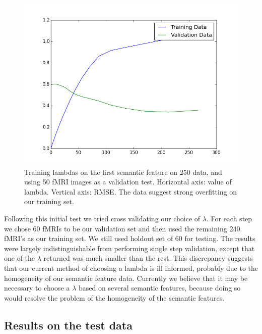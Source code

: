 \documentclass{article} %
\begin{document}
\begin{figure}[h]
\begin{center}
\includegraphics[scale=0.5]{trainvalidlambda}
\end{center}
\caption{Training lambdas on the first semantic feature on 250 data, and using 50 fMRI
images as a validation test. Horizontal axis: value of lambda. Vertical axis: RMSE. The data suggest strong overfitting on our training set.}
\end{figure}

Following this initial test we tried cross validating our choice of $\lambda$. For each step we chose 60 fMRIs to be our validation set and then used the remaining 240 fMRI's as our training set. We still used holdout set of 60 for testing. The results were largely indistinguishable from performing single step validation, except that one of the $\lambda$ returned was much smaller than the rest. This discrepancy suggests that our current method of choosing a lambda is ill informed, probably due to the homogeneity of our semantic feature data. Currently we believe that it may be necessary to choose a $\lambda$ based on several semantic features, because doing so would resolve the problem of the homogeneity of the semantic features.



\subsection{Results on the test data}
\end{document}
